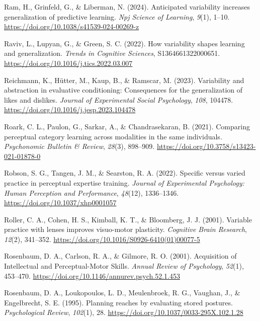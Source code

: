 \documentclass[
  11pt,
  letterpaper,
]{article}
\newlength{\cslhangindent}
\newenvironment{CSLReferences}[2] %
 {\begin{list}{}{%
  \setlength{\itemindent}{0pt}
  \setlength{\leftmargin}{0pt}
  \setlength{\parsep}{0pt}
  \ifodd #1
   \setlength{\leftmargin}{\cslhangindent}
   \setlength{\itemindent}{-1\cslhangindent}
  \fi
  \setlength{\itemsep}{#2\baselineskip}}}
 {\end{list}}
\begin{document}
\begin{CSLReferences}{1}{0}
Ram, H., Grinfeld, G., \& Liberman, N. (2024). Anticipated variability
increases generalization of predictive learning. \emph{Npj Science of
Learning}, \emph{9}(1), 1--10.
\url{https://doi.org/10.1038/s41539-024-00269-z}

Raviv, L., Lupyan, G., \& Green, S. C. (2022). How variability shapes
learning and generalization. \emph{Trends in Cognitive Sciences},
S1364661322000651. \url{https://doi.org/10.1016/j.tics.2022.03.007}

Reichmann, K., Hütter, M., Kaup, B., \& Ramscar, M. (2023). Variability
and abstraction in evaluative conditioning: {Consequences} for the
generalization of likes and dislikes. \emph{Journal of Experimental
Social Psychology}, \emph{108}, 104478.
\url{https://doi.org/10.1016/j.jesp.2023.104478}

Roark, C. L., Paulon, G., Sarkar, A., \& Chandrasekaran, B. (2021).
Comparing perceptual category learning across modalities in the same
individuals. \emph{Psychonomic Bulletin \& Review}, \emph{28}(3),
898--909. \url{https://doi.org/10.3758/s13423-021-01878-0}

Robson, S. G., Tangen, J. M., \& Searston, R. A. (2022). Specific versus
varied practice in perceptual expertise training. \emph{Journal of
Experimental Psychology: Human Perception and Performance},
\emph{48}(12), 1336--1346. \url{https://doi.org/10.1037/xhp0001057}

Roller, C. A., Cohen, H. S., Kimball, K. T., \& Bloomberg, J. J. (2001).
Variable practice with lenses improves visuo-motor plasticity.
\emph{Cognitive Brain Research}, \emph{12}(2), 341--352.
\url{https://doi.org/10.1016/S0926-6410(01)00077-5}

Rosenbaum, D. A., Carlson, R. A., \& Gilmore, R. O. (2001). Acquisition
of {Intellectual} and {Perceptual-Motor Skills}. \emph{Annual Review of
Psychology}, \emph{52}(1), 453--470.
\url{https://doi.org/10.1146/annurev.psych.52.1.453}

Rosenbaum, D. A., Loukopoulos, L. D., Meulenbroek, R. G., Vaughan, J.,
\& Engelbrecht, S. E. (1995). Planning reaches by evaluating stored
postures. \emph{Psychological Review}, \emph{102}(1), 28.
\url{https://doi.org/10.1037/0033-295X.102.1.28}


\end{CSLReferences}
\end{document}
